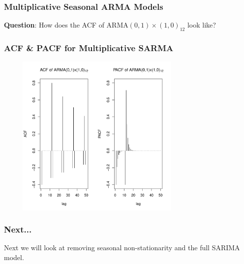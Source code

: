\documentclass[%
xcolor=pdftex]{beamer}
\begin{document}
\begin{frame}
\frametitle{Multiplicative Seasonal ARMA Models}

\textbf{Question}: How does the ACF of ARMA$(0,1) \times (1,0)_{12}$ look like?

\vspace{50mm}

\end{frame}

\begin{frame}
\frametitle{ACF \& PACF for Multiplicative SARMA}

\includegraphics[width=100mm, height=80mm]{arma_acf.pdf}

\end{frame}

\begin{frame}
\frametitle{Next...}

Next we will look at removing seasonal non-stationarity and the full SARIMA model.

\end{frame}
\end{document}
